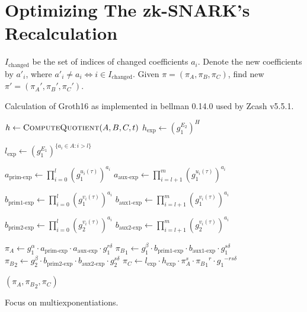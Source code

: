 \documentclass{article}
\begin{document}
\section{Optimizing The zk-SNARK's Recalculation}

$I_\text{changed}$ be the set of indices of changed coefficients $a_i$.
Denote the new coefficients by $a'_i$, where $a'_i \neq a_i \iff i \in I_\text{changed}$.
Given $\pi = (\pi_A, \pi_B, \pi_C)$, find new $\pi' = (\pi_A', \pi_B', \pi_C')$.

\begin{algorithm}
\caption{Calculation of Groth16 as implemented in bellman 0.14.0 used by Zcash v5.5.1.}
\begin{algorithmic}
                \State $h \gets \Call{ComputeQuotient}{A, B, C, t}$
                \State $h_\text{exp} \gets {(g_1^{E_2})}^H$

                \State $l_\text{exp} \gets {(g_1^{E_1})}^{\{a_i \in A \colon i > l\}}$

                \State $a_\text{prim-exp} \gets \prod_{i=0}^l {(g_1^{u_i(\tau)})}^{a_i}$
                \State $a_\text{aux-exp} \gets \prod_{i=l+1}^m {(g_1^{u_i(\tau)})}^{a_i}$

                \State $b_\text{prim1-exp} \gets \prod_{i=0}^l {(g_1^{v_i(\tau)})}^{a_i}$
                \State $b_\text{aux1-exp} \gets \prod_{i=l+1}^m {(g_1^{v_i(\tau)})}^{a_i}$

                \State $b_\text{prim2-exp} \gets \prod_{i=0}^l {(g_2^{v_i(\tau)})}^{a_i}$
                \State $b_\text{aux2-exp} \gets \prod_{i=l+1}^m {(g_2^{v_i(\tau)})}^{a_i}$

                \State $\pi_A \gets g_1^\alpha \cdot a_\text{prim-exp} \cdot a_\text{aux-exp} \cdot g_1^{r\delta}$
                \State ${\pi_B}_1 \gets g_1^\beta \cdot b_\text{prim1-exp} \cdot b_\text{aux1-exp} \cdot g_1^{s\delta}$
                \State ${\pi_B}_2 \gets g_2^\beta \cdot b_\text{prim2-exp} \cdot b_\text{aux2-exp} \cdot g_2^{s\delta}$
                \State $\pi_C \gets l_\text{exp} \cdot h_\text{exp} \cdot \pi_A^s \cdot {{\pi_B}_1}^r \cdot {g_1}^{-rs\delta}$

                \State \Return $(\pi_A, {\pi_B}_2, \pi_C)$
        \EndProcedure
\end{algorithmic}
\end{algorithm}

Focus on multiexponentiations.
\end{document}
